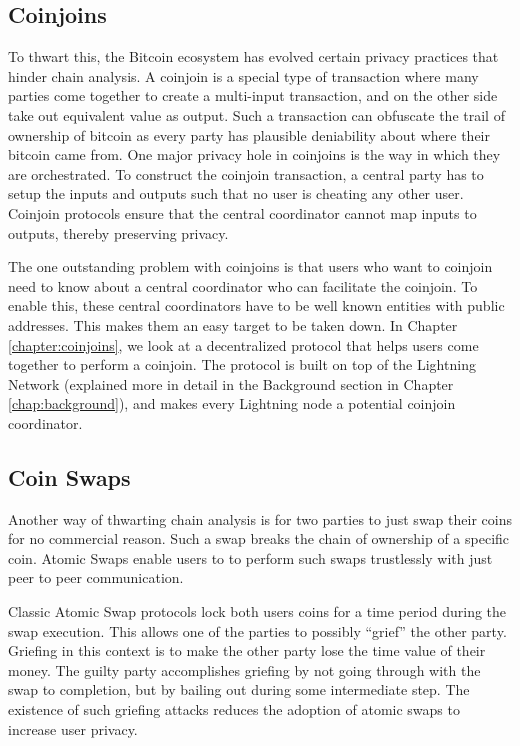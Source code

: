 \subsection{Coinjoins}
To thwart this, the Bitcoin ecosystem has evolved certain privacy practices that hinder chain analysis. A coinjoin is a special type of transaction where many parties come together to create a multi-input transaction, and on the other side take out equivalent value as output. Such a transaction can obfuscate the trail of ownership of bitcoin as every party has plausible deniability about where their bitcoin came from. One major privacy hole in coinjoins is the way in which they are orchestrated. To construct the coinjoin transaction, a central party has to setup the inputs and outputs such that no user is cheating any other user. Coinjoin protocols ensure that the central coordinator cannot map inputs to outputs, thereby preserving privacy. 

The one outstanding problem with coinjoins is that users who want to coinjoin need to know about a central coordinator who can facilitate the coinjoin. To enable this, these central coordinators have to be well known entities with public addresses. This makes them an easy target to be taken down. In Chapter \ref{chapter:coinjoins}, we look at a decentralized protocol that helps users come together to perform a coinjoin. The protocol is built on top of the Lightning Network (explained more in detail in the Background section in Chapter \ref{chap:background}), and makes every Lightning node a potential coinjoin coordinator. 

\subsection{Coin Swaps}
Another way of thwarting chain analysis is for two parties to just swap their coins for no commercial reason. Such a swap breaks the chain of ownership of a specific coin. Atomic Swaps enable users to to perform such swaps trustlessly with just peer to peer communication.

Classic Atomic Swap protocols lock both users coins for a time period during the swap execution. This allows one of the parties to possibly ``grief'' the other party. Griefing in this context is to make the other party lose the time value of their money. The guilty party accomplishes griefing by not going through with the swap to completion, but by bailing out during some intermediate step. The existence of such griefing attacks reduces the adoption of atomic swaps to increase user privacy. 

